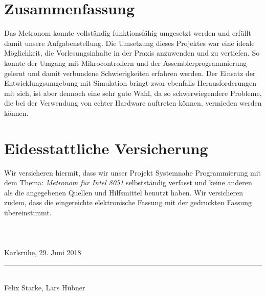 \documentclass[a4paper, 12pt]{scrartcl}
\def \autoren {Felix Starke, Lars Hübner}
\def \titel {Metronom für Intel 8051}
\def \arbeit {Projekt Systemnahe Programmierung}
\begin{document}
\begin{onehalfspace}
\newpage
\section{Zusammenfassung}
Das Metronom konnte vollständig funktionsfähig umgesetzt werden und erfüllt damit unsere Aufgabenstellung. Die Umsetzung dieses Projektes war eine ideale Möglichkeit, die Vorlesungsinhalte in der Praxis anzuwenden und zu vertiefen. So konnte der Umgang mit Mikrocontrollern und der Assemblerprogrammierung gelernt und damit verbundene Schwierigkeiten erfahren werden. Der Einsatz der Entwicklungsumgebung mit Simulation bringt zwar ebenfalls Herausforderungen mit sich, ist aber dennoch eine sehr gute Wahl, da so schwerwiegendere Probleme, die bei der Verwendung von echter Hardware auftreten können, vermieden werden können.

\newpage
\section*{Eidesstattliche Versicherung}
Wir versicheren hiermit, dass wir unser {\arbeit} mit dem Thema: {\itshape \titel } selbstständig verfasst und keine anderen als die angegebenen Quellen und Hilfsmittel benutzt haben. Wir versicheren zudem, dass die eingereichte elektronische Fassung mit der gedruckten Fassung übereinstimmt. 
\\
\\
\\
\\
\vspace{3em}
Karlsruhe, 29. Juni 2018
\vspace{4em}
\\
\rule{10cm}{0.4pt}\\
\autoren

\end{onehalfspace}
\end{document}
